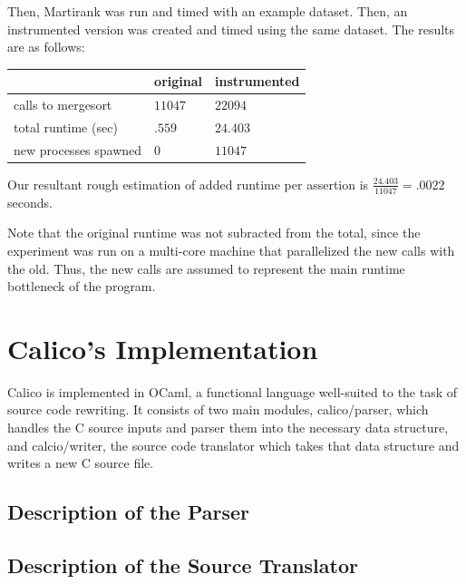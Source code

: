 \documentclass[notitlepage]{article}
\begin{document}
Then, Martirank was run and timed with an example dataset. Then, an instrumented version was created and timed using the same dataset. The results are as follows:

\begin{tabular}{l | l | l}
& original & instrumented \\ \hline
calls to mergesort & $11047$ & $22094$ \\
total runtime (sec) & $.559$ & $24.403$ \\
new processes spawned & 0 & $11047$
\end{tabular}

Our resultant rough estimation of added runtime per assertion is $\frac{24.403}{11047} = {\mathbf .0022}$ seconds.

Note that the original runtime was not subracted from the total, since the experiment was run on a multi-core machine that parallelized the new calls with the old. Thus, the new calls are assumed to represent the main runtime bottleneck of the program.

\section{Calico's Implementation}

Calico is implemented in OCaml, a functional language well-suited to the task of source code rewriting. It consists of two main modules, calico/parser, which handles the C source inputs and parser them into the necessary data structure, and calcio/writer, the source code translator which takes that data structure and writes a new C source file.

\subsection{Description of the Parser}

\subsection{Description of the Source Translator}
\end{document}
